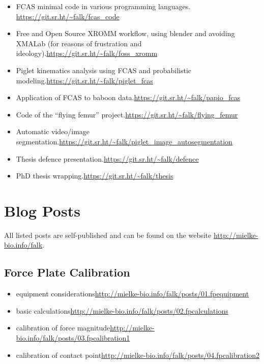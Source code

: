 \begin{change}
\begin{itemize}
\item FCAS minimal code in various programming languages. \newline \url{https://git.sr.ht/\~falk/fcas\_code}
\item Free and Open Source XROMM workflow, using blender and avoiding XMALab (for reasons of frustration and ideology).\newline \url{https://git.sr.ht/\~falk/foss\_xromm}
\item Piglet kinematics analysis using FCAS and probabilistic modeling.\newline \url{https://git.sr.ht/\~falk/piglet\_fcas}
\item Application of FCAS to baboon data.\newline \url{https://git.sr.ht/\~falk/papio\_fcas}
\item Code of the ``flying femur'' project.\newline \url{https://git.sr.ht/\~falk/flying\_femur}
\item Automatic video/image segmentation.\newline \url{https://git.sr.ht/\~falk/piglet\_image\_autosegmentation}
\item Thesis defence presentation.\newline \url{https://git.sr.ht/\~falk/defence}
\item PhD thesis wrapping.\newline \url{https://git.sr.ht/\~falk/thesis}
\end{itemize}


\section{Blog Posts}
\label{sec:org4abae20}
All listed posts are self-published and can be found on the website \url{http://mielke-bio.info/falk}.

\subsection{Force Plate Calibration}
\label{sec:orgdbb9c3a}
\begin{itemize}
\item equipment considerations\newline \url{http://mielke-bio.info/falk/posts/01.fpequipment}
\item basic calculations\newline \url{http://mielke-bio.info/falk/posts/02.fpcalculations}
\item calibration of force magnitude\newline \url{http://mielke-bio.info/falk/posts/03.fpcalibration1}
\item calibration of contact point\newline \url{http://mielke-bio.info/falk/posts/04.fpcalibration2}
\end{itemize}


\end{change}
